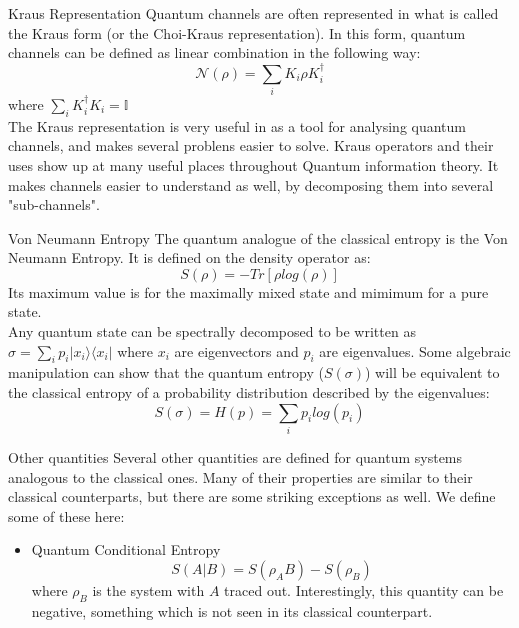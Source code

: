 \begin{frame}{Kraus Representation}
    Quantum channels are often represented in what is called the Kraus form (or the Choi-Kraus representation). In this form, quantum channels can be defined
    as linear combination in the following way:
    \begin{equation}
        \mathcal{N}(\rho) = \sum_i K_i \rho K_i^\dagger 
    \end{equation}
    where $\sum_i K_i^\dagger K_i = \mathbb{I} $\\
    The Kraus representation is very useful in as a tool for analysing quantum channels, and makes several problens easier to solve. Kraus operators and their
    uses show up at many useful places throughout Quantum information theory. It makes channels easier to understand as well, by decomposing them into several
    "sub-channels".
\end{frame}

\begin{frame}{Von Neumann Entropy}
    The quantum analogue of the classical entropy is the Von Neumann Entropy. It is defined on the density operator as:
    \begin{equation}
        S(\rho) = -Tr[\rho log(\rho)]
    \end{equation}
    Its maximum value is for the maximally mixed state and mimimum for a pure state.\\
    Any quantum state can be spectrally decomposed to be written as $\sigma = \sum_{i}p_i | x_i \rangle \langle x_i |$ where ${x_i}$ are eigenvectors
    and ${p_i}$ are eigenvalues. Some algebraic manipulation can show that the quantum entropy ($S(\sigma)$) will be equivalent to the classical entropy of
    a probability distribution described by the eigenvalues:
    \begin{equation}
        S(\sigma) = H(p) = \sum_i p_i log(p_i)
    \end{equation}
\end{frame}

\begin{frame}{Other quantities}
    Several other quantities are defined for quantum systems analogous to the classical ones. Many of their properties are similar to their classical counterparts,
    but there are some striking exceptions as well. We define some of these here:
    \begin{itemize}
        \item Quantum Conditional Entropy
        $$S(A|B) = S(\rho_AB) - S(\rho_B)$$
        where $\rho_B$ is the system with $A$ traced out. Interestingly, this quantity can be negative, something which is not seen in its classical counterpart.
    \end{itemize}
\end{frame}

